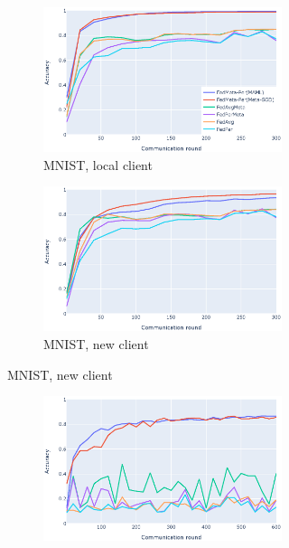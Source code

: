 \documentclass[runningheads]{llncs}
\begin{document}
\begin{figure}[h]
    \centering
    \begin{subfigure}{\textwidth}
        \centering
        \begin{subfigure}{.49\textwidth}
            \includegraphics[width=\linewidth]{img/mnist_old_per.eps}
            \caption{MNIST, local client}\label{fig:mnist_old_per}
        \end{subfigure}
        \begin{subfigure}{.49\textwidth}
            \includegraphics[width=\linewidth]{img/mnist_new_per.eps}
            \caption{MNIST, new client}\label{mnist_new_per}
        \end{subfigure}
    \end{subfigure}
    \begin{subfigure}{\textwidth}
        \centering
        \begin{subfigure}{.49\textwidth}
            \includegraphics[width=\linewidth]{img/cifar_old_per.eps}

\end{subfigure}
\end{subfigure}
\end{figure}
\end{document}
